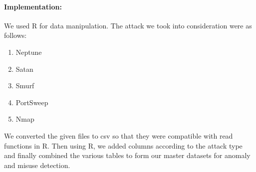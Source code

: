 \documentclass{report}
\begin{document}


  
  
  
\paragraph{Implementation:\\}
We used R for data manipulation.
The attack we took into consideration were as follows:
\begin{enumerate}
  \item Neptune
  \item Satan
  \item Smurf
  \item PortSweep
  \item Nmap
\end{enumerate}
We converted the given files to csv so that they were compatible with read functions in R. Then using R, we added columns according to the attack type and finally combined the various tables to form our master datasets for anomaly and misuse detection.

 
  
  



  
  
\end{document}
